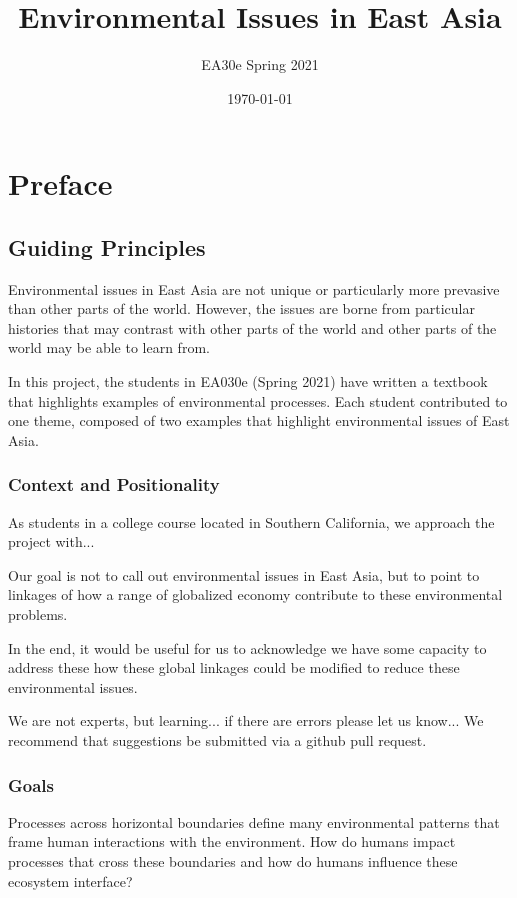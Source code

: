 \documentclass{book}\usepackage{knitr}
\title{Environmental Issues in East Asia}
\author{EA30e Spring 2021}
\date{\today}
\begin{document}
\makeglossaries
\maketitle


\frontmatter
\tableofcontents


\chapter{Preface}

\section*{Guiding Principles}

Environmental issues in East Asia are not unique or particularly more prevasive than other parts of the world. However, the issues are borne from particular histories that may contrast with other parts of the world and other parts of the world may be able to learn from. 

In this project, the students in EA030e (Spring 2021) have written a textbook that highlights examples of environmental processes. Each student contributed to one theme, composed of two examples that highlight environmental issues of East Asia. 

\subsection*{Context and Positionality}

As students in a college course located in Southern California, we approach the project with...


Our goal is not to call out environmental issues in East Asia, but to point to linkages of how a range of globalized economy contribute to these environmental problems. 

In the end, it would be useful for us to acknowledge we have some capacity to address these how these global linkages could be modified to reduce these environmental issues.

We are not experts, but learning... if there are errors please let us know... We recommend that suggestions be submitted via a github pull request.

\subsection*{Goals}

Processes across horizontal boundaries define many environmental patterns that frame human interactions with the environment. How do humans impact processes that cross these boundaries and how do humans influence these ecosystem interface?
\end{document}
